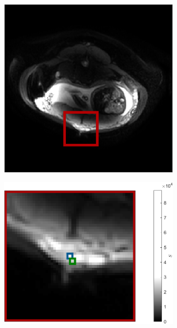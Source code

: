         \begin{figure}
            \begin{centering}
                \begin{subfigure}{0.4\textwidth}
                    \begin{centering}
                        \includegraphics[width=\textwidth]{diagrams/results-mri/real-placenta/example-placenta-mri.png}
                        \caption{}
                        \label{fig:mri-real:S}
                    \end{centering}
                \end{subfigure}
                \begin{subfigure}{0.5\textwidth}
                    \begin{centering}
                        \includegraphics[width=\textwidth]{diagrams/results-mri/real-placenta/example-placenta-mri_zoomed.png}

\end{centering}
\end{subfigure}
\end{centering}
\end{figure}
